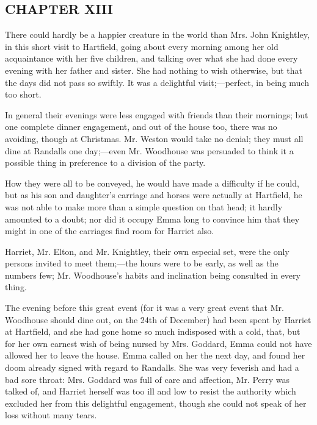 \subsection[chapter-xiii]{\useURL[url13][][][]\from[url13]CHAPTER XIII}

There could hardly be a happier creature in the world than Mrs. John Knightley, in this short visit to Hartfield, going about every morning among her old acquaintance with her five children, and talking over what she had done every evening with her father and sister. She had nothing to wish otherwise, but that the days did not pass so swiftly. It was a delightful visit;---perfect, in being much too short.

In general their evenings were less engaged with friends than their mornings; but one complete dinner engagement, and out of the house too, there was no avoiding, though at Christmas. Mr. Weston would take no denial; they must all dine at Randalls one day;---even Mr. Woodhouse was persuaded to think it a possible thing in preference to a division of the party.

How they were all to be conveyed, he would have made a difficulty if he could, but as his son and daughter's carriage and horses were actually at Hartfield, he was not able to make more than a simple question on that head; it hardly amounted to a doubt; nor did it occupy Emma long to convince him that they might in one of the carriages find room for Harriet also.

Harriet, Mr. Elton, and Mr. Knightley, their own especial set, were the only persons invited to meet them;---the hours were to be early, as well as the numbers few; Mr. Woodhouse's habits and inclination being consulted in every thing.

The evening before this great event (for it was a very great event that Mr. Woodhouse should dine out, on the 24th of December) had been spent by Harriet at Hartfield, and she had gone home so much indisposed with a cold, that, but for her own earnest wish of being nursed by Mrs. Goddard, Emma could not have allowed her to leave the house. Emma called on her the next day, and found her doom already signed with regard to Randalls. She was very feverish and had a bad sore throat: Mrs. Goddard was full of care and affection, Mr. Perry was talked of, and Harriet herself was too ill and low to resist the authority which excluded her from this delightful engagement, though she could not speak of her loss without many tears.

